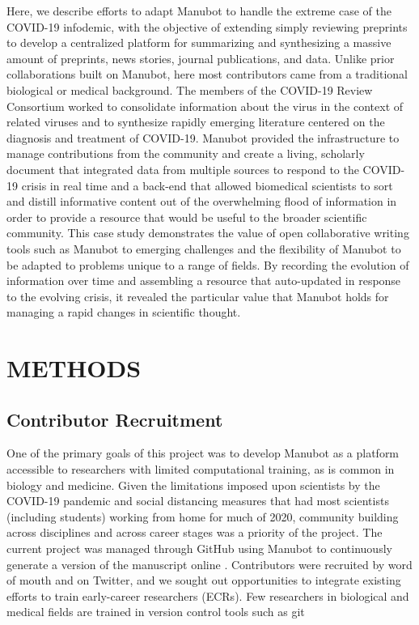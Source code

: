 \documentclass[sigconf]{acmart}
\begin{document}
Here, we describe efforts to adapt Manubot to handle the extreme case of the COVID-19 infodemic, with the objective of extending simply reviewing preprints to develop a centralized platform for summarizing and synthesizing a massive amount of preprints, news stories, journal publications, and data.
Unlike prior collaborations built on Manubot, here most contributors came from a traditional biological or medical background.
The members of the COVID-19 Review Consortium worked to consolidate information about the virus in the context of related viruses and to synthesize rapidly emerging literature centered on the diagnosis and treatment of COVID-19.
Manubot provided the infrastructure to manage contributions from the community and create a living, scholarly document that integrated data from multiple sources to respond to the COVID-19 crisis in real time and a back-end that allowed biomedical scientists to sort and distill informative content out of the overwhelming flood of information \citep{1HZeeO4Cs} in order to provide a resource that would be useful to the broader scientific community.
This case study demonstrates the value of open collaborative writing tools such as Manubot to emerging challenges and the flexibility of Manubot to be adapted to problems unique to a range of fields.
By recording the evolution of information over time and assembling a resource that auto-updated in response to the evolving crisis, it revealed the particular value that Manubot holds for managing a rapid changes in scientific thought.

\hypertarget{methods}{%
\section{METHODS}\label{methods}}

\hypertarget{contributor-recruitment}{%
\subsection{Contributor Recruitment}\label{contributor-recruitment}}

One of the primary goals of this project was to develop Manubot as a platform accessible to researchers with limited computational training, as is common in biology and medicine.
Given the limitations imposed upon scientists by the COVID-19 pandemic and social distancing measures that had most scientists (including students) working from home for much of 2020, community building across disciplines and across career stages was a priority of the project.
The current project was managed through GitHub \citep{11MwmdOKi} using Manubot \citep{YuJbg3zO} to continuously generate a version of the manuscript online \citep{yTsmmAYC}.
Contributors were recruited by word of mouth and on Twitter, and we sought out opportunities to integrate existing efforts to train early-career researchers (ECRs).
Few researchers in biological and medical fields are trained in version control tools such as git
\end{document}
